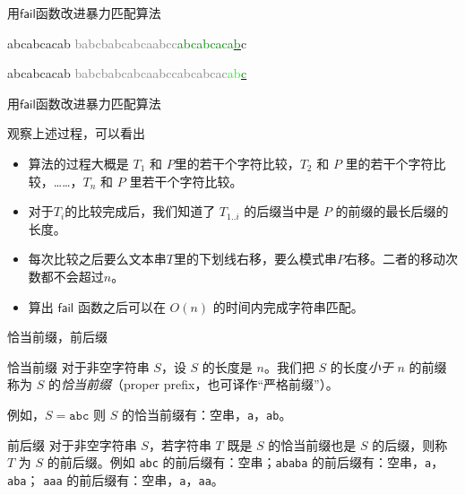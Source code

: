 \documentclass{ctexbeamer}
\newcommand{\green}[1]{\textcolor{green}{#1}}
\newcommand{\gray}[1]{\textcolor{gray}{#1}}
\newcommand{\lime}[1]{\textcolor{lime}{#1}}
\newcommand{\str}[1]{\texttt{#1}}
\newcommand{\fail}{\mathsf{fail}}
\newcommand{\ugrn}[1]{\underline{\green{#1}}}
\begin{document}
\begin{frame}[fragile]{用$\fail$函数改进暴力匹配算法}
\begin{minipage}[t]{.33\textwidth}
\begin{tverb}[fontsize=\tiny]
                abcabcacab
\gray{babcbabcabcaabcc}\green{abcabcaca}\ugrn{b}c
\end{tverb}

\begin{tverb}[fontsize=\tiny]
                        abcabcacab
\gray{babcbabcabcaabccabcabcac}\lime{ab}\ugrn{c}
\end{tverb}
\end{minipage}

\end{frame}


\begin{frame}{用$\fail$函数改进暴力匹配算法}

观察上述过程，可以看出

\begin{itemize}
    \item 算法的过程大概是 $T_1$ 和 $P$里的若干个字符比较，$T_2$ 和 $P$ 里的若干个字符比较，……，$T_n$ 和 $P$ 里若干个字符比较。
    \item 对于$T_i$的比较完成后，我们知道了 $T_{1..i}$ 的后缀当中是 $P$ 的前缀的最长后缀的长度。
    \item 每次比较之后要么文本串$T$里的下划线右移，要么模式串$P$右移。二者的移动次数都不会超过$n$。
    \item 算出 $\fail$ 函数之后可以在 $O(n)$ 的时间内完成字符串匹配。
\end{itemize}

\tcbox{如何计算$\fail$函数？}

\end{frame}


\begin{frame}{恰当前缀，前后缀}

\begin{block}{恰当前缀}
  对于非空字符串 $S$，设 $S$ 的长度是 $n$。我们把 $S$ 的长度\emph{小于} $n$ 的前缀称为 $S$ 的\emph{恰当前缀}（proper prefix，也可译作``严格前缀''）。

  例如，$S= \str{abc}$ 则 $S$ 的恰当前缀有：空串，\str{a}，\str{ab}。
\end{block}

\begin{block}{前后缀}
对于非空字符串 $S$，若字符串 $T$ 既是 $S$ 的恰当前缀也是 $S$ 的后缀，则称 $T$ 为 $S$ 的前后缀。例如 \str{abc} 的前后缀有：空串；\str{ababa} 的前后缀有：空串，\str{a}，\str{aba}；
\str{aaa} 的前后缀有：空串，\str{a}，\str{aa}。

\end{block}

\end{frame}
\end{document}
